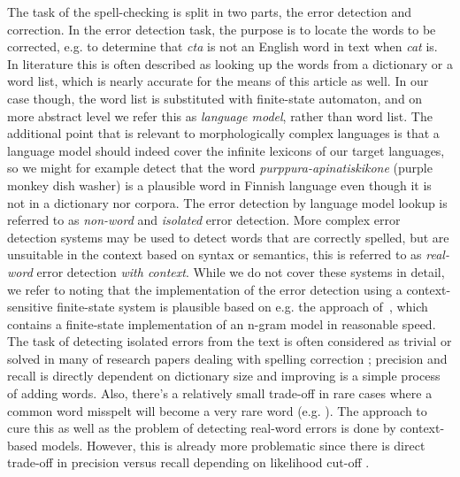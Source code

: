 \documentclass[a4paper,12pt]{article}
\begin{document}
The task of the spell-checking is split in two parts, the error detection and
correction. In the error detection task, the purpose is to locate the words to
be corrected, e.g. to determine that \emph{cta} is not an English word in text
when \emph{cat} is. In literature this is often described as looking up the
words from a dictionary or a word list, which is nearly accurate for the means
of this article as well. In our case though, the word list is substituted with
finite-state automaton, and on more abstract level we refer this as
\emph{language model}, rather than word list. The additional point that is
relevant to morphologically complex languages is that a language model should
indeed cover the infinite lexicons of our target languages, so we might for
example detect that the word \emph{purppura-apinatiskikone} (purple monkey dish
washer) is a plausible word in Finnish language even though it is not in a
dictionary nor corpora.  The error detection by language model lookup is
referred to as \emph{non-word} and \emph{isolated} error detection. More
complex error detection systems may be used to detect words that are correctly
spelled, but are unsuitable in the context based on syntax or semantics, this
is referred to as \emph{real-word} error detection \emph{with context}. While
we do not cover these systems in detail, we refer to \cite{mays/1991} noting
that the implementation of the error detection using a context-sensitive
finite-state system is plausible based on e.g. the approach
of~\cite{silfverberg/2010}, which contains a finite-state implementation of an
n-gram model in reasonable speed. The task of detecting isolated errors from
the text is often considered as trivial or solved in many of research papers
dealing with spelling correction \cite[e.g.][]{otero/2007}; precision and
recall is directly dependent on dictionary size and improving is a simple
process of adding words.  Also, there's a relatively small trade-off in rare
cases where a common word misspelt will become a very rare word (e.g.
). The approach to cure this as well as
the problem of detecting real-word errors is done by context-based models.
However, this is already more problematic since there is direct trade-off in
precision versus recall depending on likelihood cut-off
\cite[]{hirst2008evaluation,wilcoxohearn2008realword}.
\end{document}
